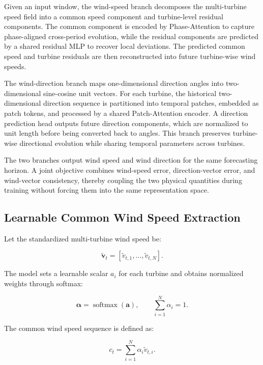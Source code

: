 Given an input window, the wind-speed branch decomposes the multi-turbine speed field into a common speed component and turbine-level residual components. The common component is encoded by Phase-Attention to capture phase-aligned cross-period evolution, while the residual components are predicted by a shared residual MLP to recover local deviations. The predicted common speed and turbine residuals are then reconstructed into future turbine-wise wind speeds.

The wind-direction branch maps one-dimensional direction angles into two-dimensional sine-cosine unit vectors. For each turbine, the historical two-dimensional direction sequence is partitioned into temporal patches, embedded as patch tokens, and processed by a shared Patch-Attention encoder. A direction prediction head outputs future direction components, which are normalized to unit length before being converted back to angles. This branch preserves turbine-wise directional evolution while sharing temporal parameters across turbines.

The two branches output wind speed and wind direction for the same forecasting horizon. A joint objective combines wind-speed error, direction-vector error, and wind-vector consistency, thereby coupling the two physical quantities during training without forcing them into the same representation space.



\subsection{Learnable Common Wind Speed Extraction}

Let the standardized multi-turbine wind speed be:

\begin{equation}
\tilde{\mathbf{v}}_t = \left[ \tilde{v}_{t,1}, \ldots, \tilde{v}_{t,N} \right].
\end{equation}

The model sets a learnable scalar $a_i$ for each turbine and obtains normalized weights through softmax:

\begin{equation}
\boldsymbol{\alpha} = \operatorname{softmax}(\mathbf{a}), \qquad \sum_{i=1}^{N}\alpha_i=1.
\end{equation}

The common wind speed sequence is defined as:

\begin{equation}
c_t = \sum_{i=1}^{N}\alpha_i\tilde{v}_{t,i}.
\end{equation}

